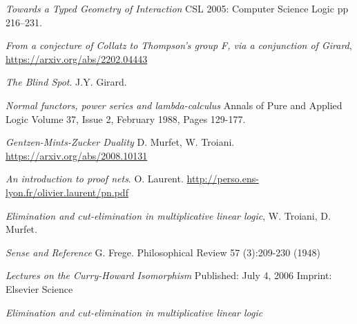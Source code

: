 \documentclass[12pt]{article}
\theoremstyle{plain}
\theoremstyle{definition}
\begin{document}
\begin{thebibliography}{99}
		 \emph{Towards a Typed Geometry of Interaction} CSL 2005: Computer Science Logic pp 216–231.
		
		 \emph{From a conjecture of Collatz to Thompson's group F, via a conjunction of Girard}, \url{https://arxiv.org/abs/2202.04443}
		
		 \emph{The Blind Spot}. J.Y. Girard.
		
		 \emph{Normal functors, power series and lambda-calculus} Annals of Pure and Applied Logic
		Volume 37, Issue 2, February 1988, Pages 129-177.
		
		 \emph{Gentzen-Mints-Zucker Duality} D. Murfet, W. Troiani. \url{https://arxiv.org/abs/2008.10131}
		
		 \emph{An introduction to proof nets}. O. Laurent. \url{http://perso.ens-lyon.fr/olivier.laurent/pn.pdf}
		
		 \emph{Elimination and cut-elimination in multiplicative linear logic}, W. Troiani, D. Murfet.
		
		 \emph{Sense and Reference} G. Frege. Philosophical Review 57 (3):209-230 (1948)
		
		 \emph{Lectures on the Curry-Howard Isomorphism} Published: July 4, 2006 Imprint: Elsevier Science

		 \emph{Elimination and cut-elimination in multiplicative linear logic}
		
	\end{thebibliography}
\end{document}
